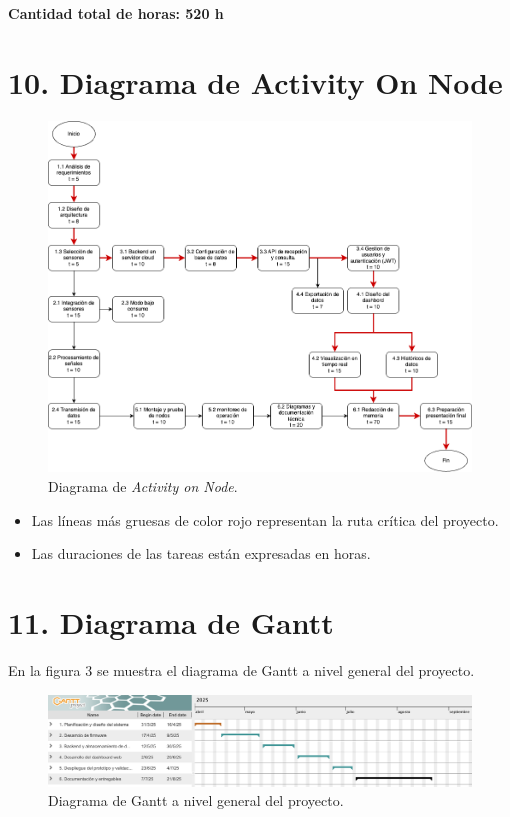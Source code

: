 \documentclass[
11pt, %
]{charter}
\begin{document}
\textbf{Cantidad total de horas: 520 h}


\section{10. Diagrama de Activity On Node}
\label{sec:AoN}


\begin{figure}[htpb]
\centering 
\includegraphics[width=1.05\textwidth]{./Figuras/DiagramAON4.png}
\caption{Diagrama de \textit{Activity on Node}.}
\label{fig:AoN}
\end{figure}
\begin{itemize}
    \item Las líneas más gruesas de color rojo representan la ruta crítica del proyecto.
    \item Las duraciones de las tareas están expresadas en horas.
\end{itemize}

\newpage

\section{11. Diagrama de Gantt}
\label{sec:gantt}
En la figura 3 se muestra el diagrama de Gantt a nivel general del proyecto.
\begin{figure}[htpb]
    \centering 
    \includegraphics[width=1.05\textwidth]{./Figuras/gantt1.png}
    \caption{Diagrama de Gantt a nivel general del proyecto.}
    \label{fig:AoN}
    \end{figure}
\end{document}
